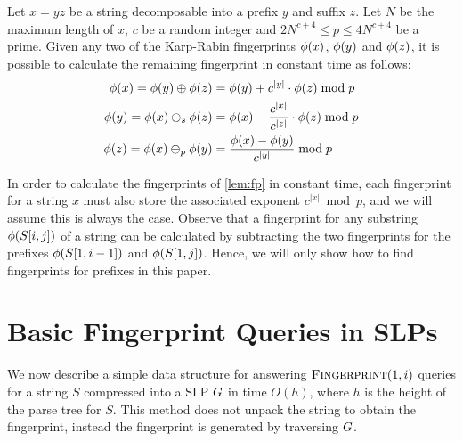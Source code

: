 \begin{lemma}\label{lem:fp}
Let $x = y z$ be a string decomposable into a prefix $y$ and suffix $z$. Let $N$ be the maximum length of $x$, $c$ be a random integer and $2N^{c+4} \leq p \leq 4N^{c+4}$ be a prime. Given any two of the Karp-Rabin fingerprints $\phi(x)$, $\phi(y)$ and $\phi(z)$, it is possible to calculate the remaining fingerprint in constant time as follows:
\begin{align*}
	\phi(x) = \phi(y) \oplus \phi(z) &= \phi(y) + c^{|y|} \cdot \phi(z) \bmod p \\
	\phi(y) = \phi(x) \ominus_s \phi(z) &= \phi(x) - \frac{c^{|x|}}{c^{|z|}} \cdot \phi(z) \bmod p \\
	\phi(z) = \phi(x) \ominus_p \phi(y) &= \frac{\phi(x) - \phi(y)}{c^{|y|}} \bmod p
\end{align*}
\end{lemma}

\noindent In order to calculate the fingerprints of \autoref{lem:fp} in constant time, each fingerprint for a string $x$ must also store the associated exponent $c^{|x|} \bmod p$, and we will assume this is always the case. Observe that a fingerprint for any substring $\phi(S[i, j])$ of a string can be calculated by subtracting the two fingerprints for the prefixes $\phi(S[1, i-1])$ and $\phi(S[1, j])$. Hence, we will only show how to find fingerprints for prefixes in this paper.

\section{Basic Fingerprint Queries in SLPs}
We now describe a simple data structure for answering $\textsc{Fingerprint}(1, i)$ queries for a string $S$ compressed into a SLP $G$ in time $O(h)$, where $h$ is the height of the parse tree for $S$. This method does not unpack the string to obtain the fingerprint, instead the fingerprint is generated by traversing $G$. 


